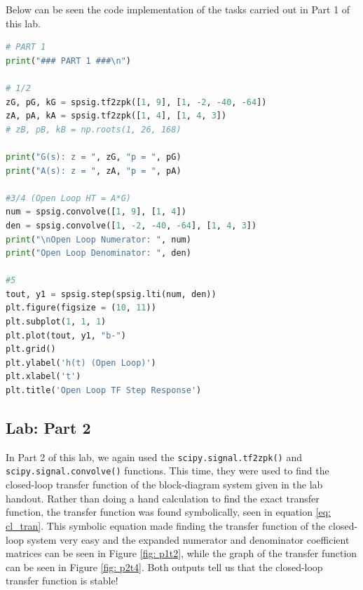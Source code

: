 \documentclass[12pt]{report}
\begin{document}
Below can be seen the code implementation of the tasks carried out in Part 1 of this lab.

\begin{lstlisting}[language=Python, basicstyle=\footnotesize]
  # PART 1
print("### PART 1 ###\n")

# 1/2
zG, pG, kG = spsig.tf2zpk([1, 9], [1, -2, -40, -64])
zA, pA, kA = spsig.tf2zpk([1, 4], [1, 4, 3])
# zB, pB, kB = np.roots(1, 26, 168)

print("G(s): z = ", zG, "p = ", pG)
print("A(s): z = ", zA, "p = ", pA)

#3/4 (Open Loop HT = A*G)
num = spsig.convolve([1, 9], [1, 4])
den = spsig.convolve([1, -2, -40, -64], [1, 4, 3])
print("\nOpen Loop Numerator: ", num)
print("Open Loop Denominator: ", den)

#5
tout, y1 = spsig.step(spsig.lti(num, den))
plt.figure(figsize = (10, 11))
plt.subplot(1, 1, 1)
plt.plot(tout, y1, "b-")
plt.grid()
plt.ylabel('h(t) (Open Loop)')
plt.xlabel('t')
plt.title('Open Loop TF Step Response')
\end{lstlisting}

\subsection{Lab: Part 2}\label{section: Part2}
In Part 2 of this lab, we again used the \texttt{scipy.signal.tf2zpk()} and \\\texttt{scipy.signal.convolve()} functions. This time, they were used to find the
closed-loop transfer function of the block-diagram system given in the lab handout. Rather than doing a hand calculation to find the exact transfer function,
the transfer function was found symbolically, seen in equation \eqref{eq: cl_tran}. This symbolic equation made finding the transfer function of the closed-loop
system very easy and the expanded numerator and denominator coefficient matrices can be seen in Figure \ref{fig: p1t2}, while the graph of the transfer function
can be seen in Figure \ref{fig: p2t4}. Both outputs tell us that the closed-loop transfer function is stable!
\end{document}
